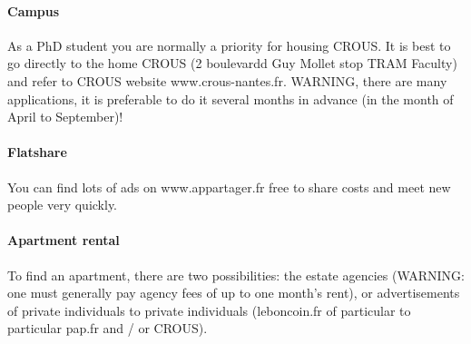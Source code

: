 \paragraph{Campus}
As a PhD student you are normally a priority for housing CROUS.
It is best to go directly to the home CROUS (2 boulevardd Guy Mollet stop TRAM Faculty) and refer to CROUS website www.crous-nantes.fr.
WARNING, there are many applications, it is preferable to do it several months in advance (in the month of April to September)!


\paragraph{Flatshare}
You can find lots of ads on www.appartager.fr free to share costs and meet new people very quickly.


\paragraph{Apartment rental}
To find an apartment, there are two possibilities: the estate agencies (WARNING: one must generally pay agency fees of up to one month's rent), or advertisements of private individuals to private individuals (leboncoin.fr of particular to particular pap.fr and / or CROUS).


